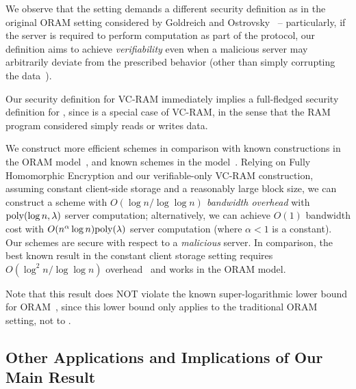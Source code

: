 We observe that the \nameshort setting demands a
different security definition as in the original ORAM setting
considered by Goldreich and Ostrovsky~\cite{oram00} -- particularly,
if the server is required to perform computation as part
of the protocol, our definition aims to achieve {\it verifiability}
even when a malicious server 
may arbitrarily deviate from the prescribed
behavior (other than simply corrupting 
the data~\cite{oram00}).

Our security definition for VC-RAM immediately implies
a full-fledged security definition for \nameshort, since
\nameshort is a special case of VC-RAM, in the sense that
the RAM program considered simply reads or writes data.

We construct more efficient
\nameshort schemes in comparison with known
constructions in the ORAM model~\cite{oram00,oram01,oram03,oram07,oram09}, and 
known schemes in the \nameshort model~\cite{oram13, LO12}.
Relying on Fully Homomorphic Encryption
and our verifiable-only VC-RAM construction,
assuming constant client-side storage and a reasonably large block size,
we can construct
a \nameshort scheme with {\it $O(\log n /\log \log n)$
bandwidth overhead}
with ${\rm poly} (\log n, \lambda)$ server computation;
alternatively, we can achieve $O(1)$ bandwidth cost
with $O(n^\alpha \log n){\rm poly}(\lambda)$ server computation (where $\alpha <1$ is a constant).
Our schemes are
secure with respect to a {\it malicious} server.
In comparison, the best known result in the
constant client storage setting requires $O(\log ^2 n/\log \log n)$
overhead~\cite{oram03} and works in the ORAM model.

Note that this result does NOT violate the known
super-logarithmic lower bound
for ORAM~\cite{oramlower}, since
this lower bound only applies to
the traditional ORAM setting, not to \nameshort.


\subsection{Other Applications and Implications of Our Main Result}
